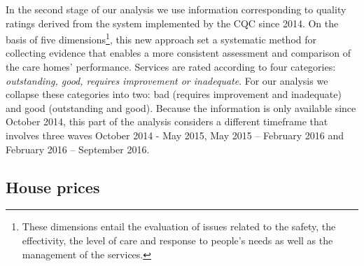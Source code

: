 \documentclass[12pt,letterpaper]{article}
\begin{document}
      
In the second stage of our analysis we use information
corresponding to quality ratings derived from the system
implemented by the CQC since 2014. On the basis of five 
dimensions\footnote{These dimensions entail the evaluation of issues related to the safety, the effectivity, 
the level of care and response to people’s needs as well as the management of the services.}, this new approach
  set a systematic method for collecting evidence that enables a more consistent assessment and comparison
   of the care homes’ performance. Services are rated according to four categories: {\it outstanding, good, requires
    improvement or inadequate}. For our analysis we collapse these categories into two: bad (requires improvement 
    and inadequate) and good (outstanding and good). Because the information is only available since October 2014, this part of the analysis considers a different
   timeframe that involves three waves October 2014 - May 2015, May 2015 – February 2016 and 
   February 2016 – September 2016. 
   
%   
  \subsection{House prices} 
  
\end{document}
